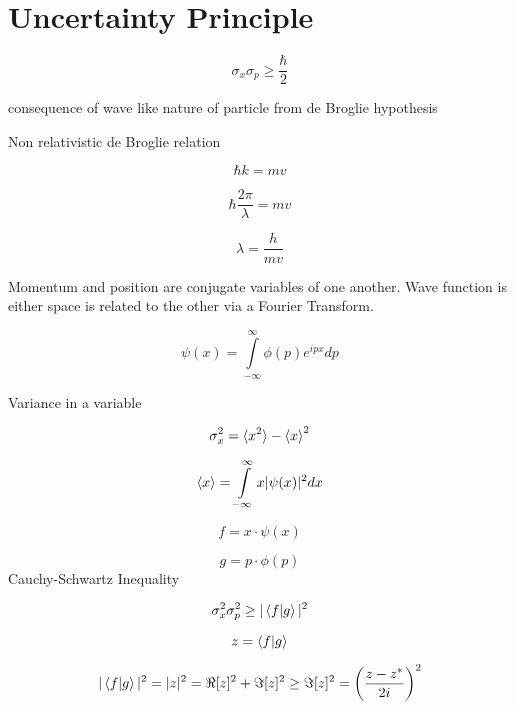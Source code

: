 \documentclass[12pt]{article}
\begin{document}
\setlength{\parindent}{0pt}
\section{Uncertainty Principle}

\[
\sigma_x \sigma_p \geq \frac{\hbar}{2}
\]

consequence of wave like nature of particle from de Broglie hypothesis

\begin{center}
Non relativistic de Broglie relation
\end{center}

\[
\hbar k = m v
\]

\[
\hbar \frac{2\pi}{\lambda} = m v
\]

\[
\lambda = \frac{h}{mv}
\]

Momentum and position are conjugate variables of one another. Wave function is either space is related to the other via a Fourier Transform.

\[
\psi(x) = \int \limits_{-\infty}^\infty \phi(p) e^{ipx} dp
\]

Variance in a variable

\[
\sigma_x^2 = \braket{x^2} - \braket{x}^2
\]

\[
\braket{x} = \int \limits_{-\infty}^\infty x |\psi(x)|^2 dx
\]

\[
f = x\cdot\psi(x)
\]

\[
g = p\cdot\phi(p)
\]
Cauchy-Schwartz Inequality

\[
\sigma_x^2 \sigma_p^2 \geq |\braket{f|g}|^2
\]

\[
z = \braket{f|g}
\]

\[
|\braket{f|g}|^2 = |z|^2 = \Re[{z}]^2 + \Im[{z}]^2 \geq \Im[{z}]^2 = \left(\frac{z - z^*}{2i}\right)^2
\]
\end{document}

